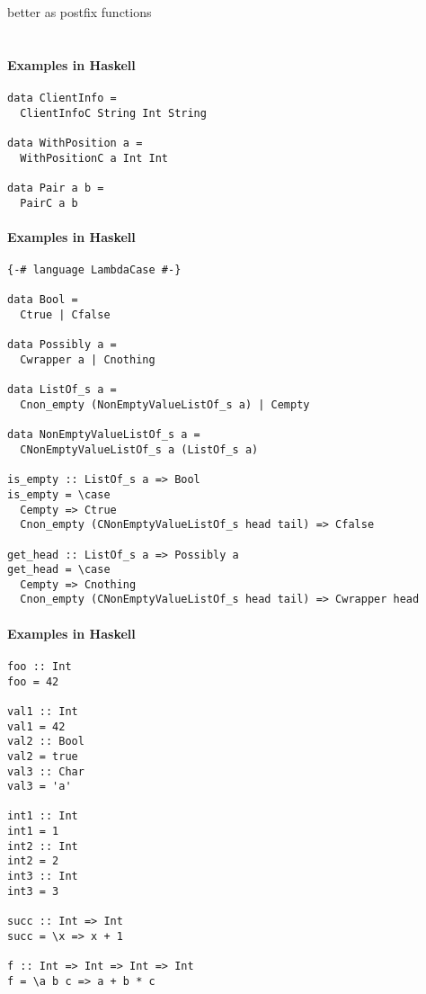 \documentclass{article}
\def\H{Haskell}
\begin{document}
better as postfix functions \\
\hspace{1cm}\\
\paragraph{Examples in \H}

\begin{verbatim}
data ClientInfo =
  ClientInfoC String Int String

data WithPosition a = 
  WithPositionC a Int Int

data Pair a b = 
  PairC a b
\end{verbatim}

\paragraph{Examples in \H}

\begin{verbatim}
{-# language LambdaCase #-}

data Bool =
  Ctrue | Cfalse

data Possibly a =
  Cwrapper a | Cnothing

data ListOf_s a =
  Cnon_empty (NonEmptyValueListOf_s a) | Cempty

data NonEmptyValueListOf_s a =
  CNonEmptyValueListOf_s a (ListOf_s a)

is_empty :: ListOf_s a => Bool
is_empty = \case
  Cempty => Ctrue
  Cnon_empty (CNonEmptyValueListOf_s head tail) => Cfalse

get_head :: ListOf_s a => Possibly a
get_head = \case
  Cempty => Cnothing
  Cnon_empty (CNonEmptyValueListOf_s head tail) => Cwrapper head
\end{verbatim}

\paragraph{Examples in \H}
\begin{verbatim}
foo :: Int
foo = 42

val1 :: Int
val1 = 42
val2 :: Bool
val2 = true
val3 :: Char
val3 = 'a'

int1 :: Int
int1 = 1
int2 :: Int
int2 = 2
int3 :: Int
int3 = 3

succ :: Int => Int
succ = \x => x + 1

f :: Int => Int => Int => Int
f = \a b c => a + b * c
\end{verbatim}
\end{document}
